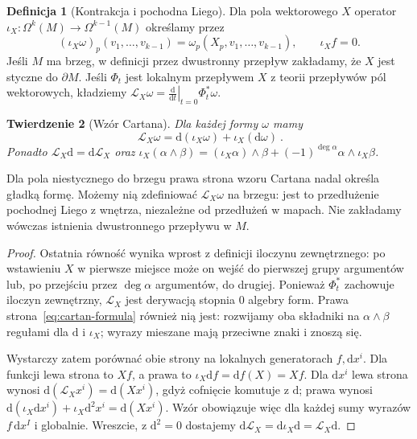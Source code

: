 \documentclass[11pt,a4paper,oneside]{report}
\newcommand{\Lie}{\mathcal L}
\newcommand{\dd}{\mathrm d}
\theoremstyle{plain}
\newtheorem{twierdzenie}{Twierdzenie}[section]
\theoremstyle{definition}
\newtheorem{definicja}[twierdzenie]{Definicja}
\theoremstyle{remark}
\begin{document}
\begin{definicja}[Kontrakcja i pochodna Liego]
\label{def:formy-kontrakcja-lie}
Dla pola wektorowego $X$ operator
$\iota_X:\Omega^k(M)\to\Omega^{k-1}(M)$ określamy przez
\[
 (\iota_X\omega)_p(v_1,\ldots,v_{k-1})
 =\omega_p(X_p,v_1,\ldots,v_{k-1}),
 \qquad \iota_Xf=0.
\]
Jeśli $M$ ma brzeg, w definicji przez dwustronny przepływ
zakładamy, że $X$ jest styczne do $\partial M$.
Jeśli $\Phi_t$ jest lokalnym przepływem $X$ z teorii przepływów pól wektorowych, kładziemy
$\Lie_X\omega=\left.\frac{\dd}{\dd t}\right|_{t=0}\Phi_t^*\omega$.
\end{definicja}

\begin{twierdzenie}[Wzór Cartana]
\label{thm:cartan-formy}
Dla każdej formy $\omega$ mamy
\begin{equation}\label{eq:cartan-formula}
 {\ \Lie_X\omega=\dd(\iota_X\omega)
       +\iota_X(\dd\omega)\ }.
\end{equation}
Ponadto $\Lie_X\dd=\dd\Lie_X$ oraz
$\iota_X(\alpha\wedge\beta)=
(\iota_X\alpha)\wedge\beta
+(-1)^{\deg\alpha}\alpha\wedge\iota_X\beta$.
\end{twierdzenie}
Dla pola niestycznego do brzegu prawa strona wzoru Cartana
nadal określa gładką formę. Możemy nią zdefiniować
$\Lie_X\omega$ na brzegu: jest to przedłużenie pochodnej
Liego z wnętrza, niezależne od przedłużeń w mapach.
Nie zakładamy wówczas istnienia dwustronnego przepływu w $M$.
\begin{proof}
Ostatnia równość wynika wprost z definicji iloczynu
zewnętrznego: po wstawieniu $X$ w pierwsze miejsce
może on wejść do pierwszej grupy argumentów lub,
po przejściu przez $\deg\alpha$ argumentów, do drugiej.
Ponieważ $\Phi_t^*$ zachowuje iloczyn zewnętrzny,
$\Lie_X$ jest derywacją stopnia $0$ algebry form.
Prawa strona~\eqref{eq:cartan-formula} również nią jest:
rozwijamy oba składniki na $\alpha\wedge\beta$
regułami dla $\dd$ i $\iota_X$; wyrazy mieszane mają
przeciwne znaki i znoszą się.

Wystarczy zatem porównać obie strony na lokalnych
generatorach $f,\dd x^i$. Dla funkcji lewa strona to
$Xf$, a prawa to $\iota_X\dd f=\dd f(X)=Xf$.
Dla $\dd x^i$ lewa strona wynosi
$\dd(\Lie_Xx^i)=\dd(Xx^i)$, gdyż cofnięcie
komutuje z $\dd$; prawa wynosi
$\dd(\iota_X\dd x^i)+\iota_X\dd^2x^i
=\dd(Xx^i)$. Wzór obowiązuje więc dla
każdej sumy wyrazów $f\,\dd x^I$ i globalnie.
Wreszcie, z $\dd^2=0$ dostajemy
$\dd\Lie_X=\dd\iota_X\dd
=\Lie_X\dd$.
\end{proof}
\end{document}
